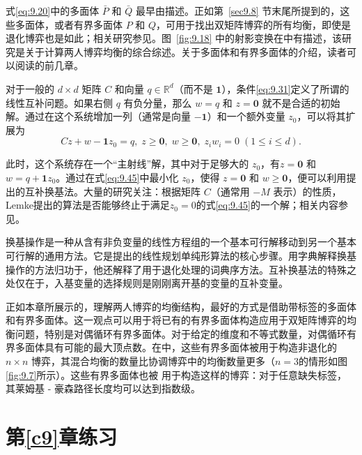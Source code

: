 式\eqref{eq:9.20}中的多面体 \(\bar{P}\) 和 \(\bar{Q}\) 最早由\citet{mangasarian1964}描述。正如第~\ref{sec9.8} 节末尾所提到的，这些多面体，或者有界多面体 \(P\) 和 \(Q\)，可用于找出双矩阵博弈的所有均衡，即使是退化博弈也是如此；相关研究参见\citet*{avis2010}。图~\ref{fig:9.18} 中的射影变换在\citet{vonstengel2002}中有描述，该研究是关于计算两人博弈均衡的综合综述。关于多面体和有界多面体的介绍，读者可以阅读\citet{ziegler1995}的前几章。


对于一般的 \(d \times  d\) 矩阵 \(C\) 和向量 \(q \in  {\mathbb{R}}^{d}\)（而不是 $\mathbf{1}$），条件\eqref{eq:9.31}定义了所谓的线性互补问题。如果右侧 \(q\) 有负分量，那么 \(w = q\) 和 \(z = \mathbf{0}\) 就不是合适的初始解。通过在这个系统增加一列（通常是向量 $-\mathbf{1}$）和一个额外变量 \({z}_{0}\)，可以将其扩展为
\begin{equation}
\label{eq:9.45}
{Cz} + w - \mathbf{1}{z}_{0} = q,\;z \geq  \mathbf{0},\;w \geq  \mathbf{0},\;{z}_{i}{w}_{i} = 0\;\left( {1 \leq  i \leq  d}\right).
\end{equation}


此时，这个系统存在一个“主射线”解，其中对于足够大的 \({z}_{0}\)，有\(z = \mathbf{0}\) 和 \(w = q + \mathbf{1}{z}_{0}\)。通过在式\eqref{eq:9.45}中最小化 \({z}_{0}\)，使得 \(z = \mathbf{0}\) 和 \(w \geq  \mathbf{0}\)，便可以利用\citet{lemke1965}提出的互补换基法。大量的研究关注：根据矩阵 \(C\)（通常用 \(- M\) 表示）的性质，Lemke提出的算法是否能够终止于满足\({z}_{0} = 0\)的式\eqref{eq:9.45}的一个解；相关内容参见\citet*{cottle1992}。


换基操作是一种从含有非负变量的线性方程组的一个基本可行解移动到另一个基本可行解的通用方法。它是\citet{dantzig1963}提出的线性规划单纯形算法的核心步骤。用字典解释换基操作的方法归功于\citet[p.~34]{chvatal1983}，他还解释了用于退化处理的词典序方法。互补换基法的特殊之处仅在于，入基变量的选择规则是刚刚离开基的变量的互补变量。

正如本章所展示的，理解两人博弈的均衡结构，最好的方式是借助带标签的多面体和有界多面体。这一观点可以用于将已有的有界多面体构造应用于双矩阵博弈的均衡问题，特别是对偶循环有界多面体。对于给定的维度和不等式数量，对偶循环有界多面体具有可能的最大顶点数\citep[p.~10f]{ziegler1995}。在\citet{vonstengel1999}中，这些有界多面体被用于构造非退化的 \(n \times  n\) 博弈，其混合均衡的数量比协调博弈中的均衡数量更多（\(n = 3\)的情形如图\ref{fig:9.7}所示）。这些有界多面体也被
\citet{savani2006,savani2016}用于构造这样的博弈：对于任意缺失标签，其莱姆基 - 豪森路径长度均可以达到指数级。


\section{第\ref{c9}章练习}   \label{sec9.10}

